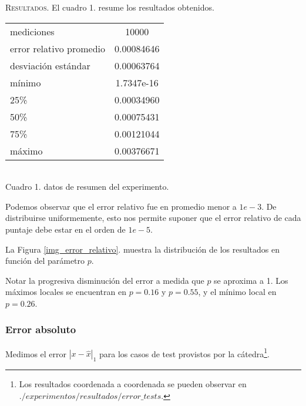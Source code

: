 \noindent \textsc{Resultados}. El cuadro 1. resume los resultados obtenidos. 
\vspace{1.5em}

\begin{center}
    \begin{tabular}{ |l|c| } 
     \hline
    mediciones              & 10000         \\
    error relativo promedio & 0.00084646    \\
    desviación estándar     & 0.00063764    \\
    mínimo                  & 1.7347e-16    \\
    25\%                    & 0.00034960    \\
    50\%                    & 0.00075431    \\
    75\%                    & 0.00121044    \\
    máximo                  & 0.00376671    \\
    \hline
    \end{tabular} \\
    \bigskip
    Cuadro 1. datos de resumen del experimento. 
\end{center}
\vspace{1em}

Podemos observar que el error relativo fue en promedio menor a $1e-3$. De distribuirse uniformemente, esto nos permite suponer que el error relativo de cada puntaje debe estar en el orden de $1e-5$.
\vspace{1em}

La Figura \ref{img_error_relativo}. muestra la distribución de los resultados en función del parámetro $p$.

\vspace{1em}

Notar la progresiva disminución del error a medida que $p$ se aproxima a 1. Los máximos locales se encuentran en $p = 0.16$ y $p = 0.55$, y el mínimo local en $p = 0.26$. 



\vspace{2em}
\subsubsection{Error absoluto} Medimos el error $|x - \hat{x}|_1$ para los casos de test provistos por la cátedra\footnote{Los resultados coordenada a coordenada se pueden observar en $./experimentos/resultados/error\_tests$.}. 
\vspace{1em}


